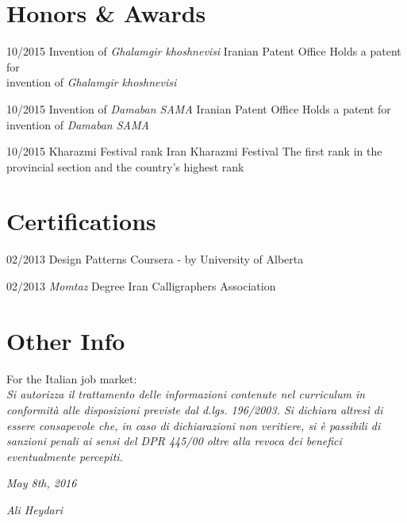 \documentclass[a4paper]{friggeri-cv}
\begin{document}



\section{Honors \& Awards}
\begin{entrylist}

      \entry
    {10/2015}
    {   Invention of \emph{Ghalamgir khoshnevisi}}
    {Iranian Patent Office}
    {Holds a patent for\\
    invention of \emph{Ghalamgir khoshnevisi}}

          \entry
    {10/2015}
    {   Invention of \emph{Damaban SAMA}}
    {Iranian Patent Office}
    {Holds a patent for \\
    invention of \emph{Damaban SAMA}}

              \entry
    {10/2015}
    {   Kharazmi Festival rank}
    {Iran Kharazmi Festival}
    {The first rank in the provincial section and the country's highest rank}

\end{entrylist}
\section{Certifications}
\begin{entrylist}
  \entry
    {02/2013}
    {Design Patterns}
    {Coursera - by University of Alberta}
    {}
    
    \entry
     {02/2013}
   {\emph{Momtaz} Degree}
    {Iran Calligraphers Association}
    {}
\end{entrylist}

\section{Other Info}
For the Italian job market:\\
\emph{Si autorizza il trattamento delle informazioni contenute nel curriculum in conformità alle disposizioni previste dal d.lgs. 196/2003. Si dichiara altresì di essere consapevole che, in caso di dichiarazioni non veritiere, si è passibili di sanzioni penali ai sensi del DPR 445/00 oltre alla revoca dei benefici eventualmente percepiti.}
\\
\begin{flushleft}
\emph{May 8th, 2016}
\end{flushleft}
\begin{flushright}
\emph{Ali Heydari}
\end{flushright}
\end{document}
